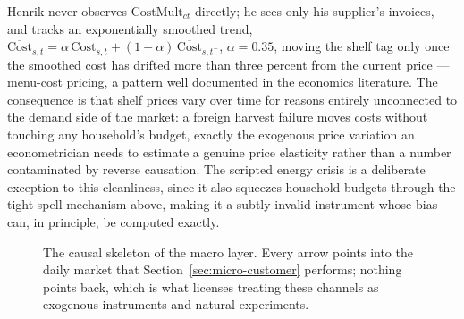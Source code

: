 \documentclass[12pt,a4paper]{article}
\begin{document}
Henrik never observes $\text{CostMult}_{ct}$ directly; he sees only his
supplier's invoices, and tracks an exponentially smoothed trend,
$\overline{\text{Cost}}_{s,t} = \alpha\,\text{Cost}_{s,t} +
(1-\alpha)\,\overline{\text{Cost}}_{s,t^-}$, $\alpha=0.35$, moving the
shelf tag only once the smoothed cost has drifted more than three
percent from the current price --- menu-cost pricing, a pattern well
documented in the economics literature. The consequence is that shelf
prices vary over time for reasons entirely unconnected to the demand
side of the market: a foreign harvest failure moves costs without
touching any household's budget, exactly the exogenous price variation
an econometrician needs to estimate a genuine price elasticity rather
than a number contaminated by reverse causation. The scripted energy
crisis is a deliberate exception to this cleanliness, since it also
squeezes household budgets through the tight-spell mechanism above,
making it a subtly invalid instrument whose bias can, in principle, be
computed exactly.

\begin{figure}[htbp]
\centering
{}
\caption{The causal skeleton of the macro layer. Every arrow points into the daily market that Section~\ref{sec:micro-customer} performs; nothing points back, which is what licenses treating these channels as exogenous instruments and natural experiments.}
\label{fig:phase2graph}
\end{figure}
\end{document}
